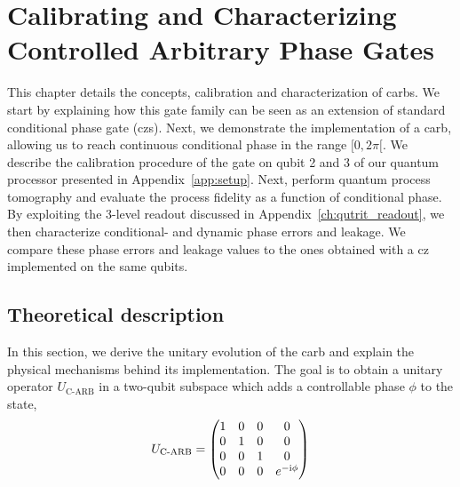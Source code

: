 \chapter{Calibrating and Characterizing Controlled Arbitrary Phase Gates} \label{ch:carb}
This chapter details the concepts, calibration and characterization of \glspl{carb}. We start by explaining how this gate family can be seen as an extension of standard conditional phase gate (\glspl{cz}). Next, we demonstrate the implementation of a \gls{carb}, allowing us to reach continuous conditional phase in the range $[0, 2\pi[$. We describe the calibration procedure of the gate on qubit 2 and 3 of our quantum processor presented in Appendix~\ref{app:setup}. Next, perform quantum process tomography and evaluate the process fidelity as a function of conditional phase. By exploiting the 3-level readout discussed in Appendix~\ref{ch:qutrit_readout}, we then characterize conditional- and dynamic phase errors and leakage. We compare these phase errors and leakage values to the ones obtained with a \gls{cz} implemented on the same qubits.

\section{Theoretical description} \label{sec:c_arb_theory}
In this section, we derive the unitary evolution of the \gls{carb} and explain the physical mechanisms behind its implementation. The goal is to obtain a unitary operator $U_{\textrm{C-ARB}}$ in a two-qubit subspace which adds a controllable phase $\phi$ to the \oo{} state, 
\begin{equation} \label{eq:carb_unitary}
    U_{\textrm{C-ARB}}=
    \begin{pmatrix}
{1} & {0} & {0} & {0} \\
{0} & {1} & {0} & {0} \\
{0} & {0} & {1} & {0} \\
{0} & {0} & {0} & {e^{-\mathrm i \phi}}
\end{pmatrix}
\end{equation}

